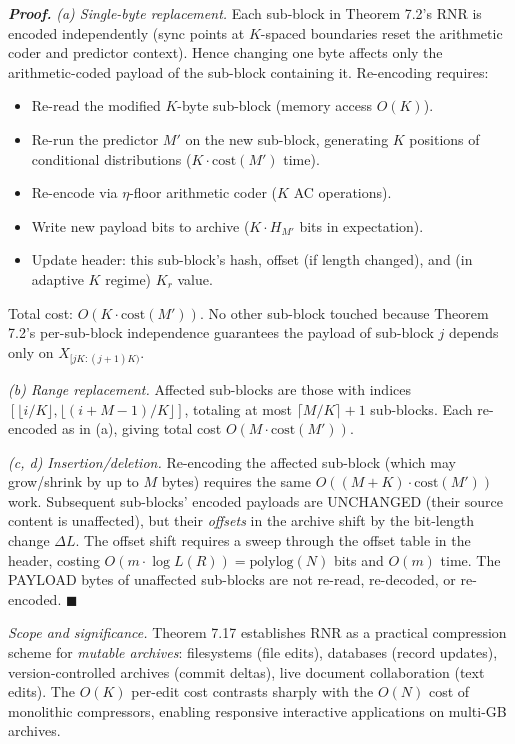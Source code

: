 \documentclass[
]{article}
\begin{document}
\emph{\textbf{Proof.}} \emph{(a) Single-byte replacement.}
Each sub-block in Theorem 7.2's RNR is encoded independently (sync
points at $K$-spaced boundaries reset the arithmetic coder and
predictor context). Hence changing one byte affects only the
arithmetic-coded payload of the sub-block containing it.
Re-encoding requires:
\begin{itemize}
\item Re-read the modified $K$-byte sub-block (memory access $O(K)$).
\item Re-run the predictor $M'$ on the new sub-block, generating $K$
positions of conditional distributions ($K \cdot \mathrm{cost}(M')$
time).
\item Re-encode via $\eta$-floor arithmetic coder ($K$ AC operations).
\item Write new payload bits to archive ($K \cdot H_{M'}$ bits in
expectation).
\item Update header: this sub-block's hash, offset (if length
changed), and (in adaptive $K$ regime) $K_r$ value.
\end{itemize}
Total cost: $O(K \cdot \mathrm{cost}(M'))$. No other sub-block touched
because Theorem 7.2's per-sub-block independence guarantees the
payload of sub-block $j$ depends only on $X_{[jK : (j+1)K)}$.

\emph{(b) Range replacement.} Affected sub-blocks are those with
indices $[\lfloor i/K \rfloor, \lfloor (i+M-1)/K \rfloor]$, totaling
at most $\lceil M/K \rceil + 1$ sub-blocks. Each re-encoded as in (a),
giving total cost $O(M \cdot \mathrm{cost}(M'))$.

\emph{(c, d) Insertion/deletion.} Re-encoding the affected sub-block
(which may grow/shrink by up to $M$ bytes) requires the same $O((M+K)
\cdot \mathrm{cost}(M'))$ work. Subsequent sub-blocks' encoded
payloads are UNCHANGED (their source content is unaffected), but
their \emph{offsets} in the archive shift by the bit-length change
$\Delta L$. The offset shift requires a sweep through the offset
table in the header, costing $O(m \cdot \log L(R)) = \mathrm{polylog}(N)$
bits and $O(m)$ time. The PAYLOAD bytes of unaffected sub-blocks are
not re-read, re-decoded, or re-encoded.
\hfill$\blacksquare$

\emph{Scope and significance.} Theorem 7.17 establishes RNR as a
practical compression scheme for \emph{mutable archives}: filesystems
(file edits), databases (record updates), version-controlled archives
(commit deltas), live document collaboration (text edits). The
$O(K)$ per-edit cost contrasts sharply with the $O(N)$ cost of
monolithic compressors, enabling responsive interactive applications
on multi-GB archives.
\end{document}
